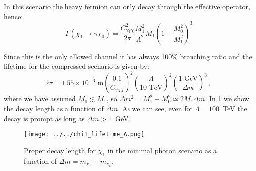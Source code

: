 \documentclass[a4paper,11pt]{article}
\begin{document}
In this scenario the heavy fermion can only decay through the effective operator, hence:
\begin{equation}
	\Gamma (\chi_1 \to \gamma \chi_0) = \frac{C_{\gamma\chi\chi}^2}{2 \pi} \frac{M_1^2}{\Lambda^2} M_1 \left(1-\frac{M_0^2}{M_1^2}\right)^3
\end{equation} 

Since this is the only allowed channel it has always 100\% branching ratio and the lifetime for the compressed scenario is given by:
\begin{equation}
	c \tau = 1.55 \times 10^{-6} \mbox{ m} \left(\frac{0.1}{C_{\gamma\chi\chi}}\right)^2 \left(\frac{\Lambda}{10\mbox{ TeV}}\right)^2 \left(\frac{1 \mbox{ GeV}}{\Delta m}\right)^{3}\, ,
\end{equation}
where we have assumed $M_0 \lesssim M_1$, so $\Delta m^2 = M_1^2 - M_0^2 \simeq 2 M_1 \Delta m$. In \cref{fig:chi1_lifetimeA} we show the decay length as a function of $\Delta m$. As we can see, even for $\Lambda = 100$~TeV the decay is prompt as long as $\Delta m > 1$~GeV.

\begin{figure}
	\centering
	\texttt{[image: ../../chi1\_lifetime\_A.png]}
	\caption{Proper decay length for $\chi_1$ in the minimal photon scenario as a function of $\Delta m = m_{\chi_1} - m_{\chi_0}$.} \label{fig:chi1_lifetimeA}
\end{figure}

%
%
\end{document}
